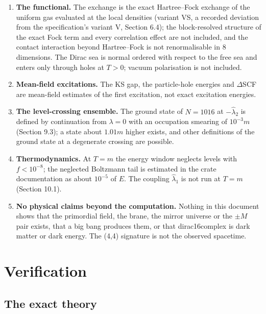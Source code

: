\documentclass[11pt]{article}
\begin{document}
\begin{enumerate}
\item \textbf{The functional.} The exchange is the exact Hartree--Fock exchange of the uniform gas evaluated at the local densities (variant VS, a recorded deviation from the specification's variant V, Section 6.4); the block-resolved structure of the exact Fock term and every correlation effect are not included, and the contact interaction beyond Hartree--Fock is not renormalisable in 8 dimensions. The Dirac sea is normal ordered with respect to the free sea and enters only through holes at $T>0$; vacuum polarisation is not included.
\item \textbf{Mean-field excitations.} The KS gap, the particle-hole energies and $\Delta$SCF are mean-field estimates of the first excitation, not exact excitation energies.
\item \textbf{The level-crossing ensemble.} The ground state of $N=1016$ at $-\hat\lambda_2$ is defined by continuation from $\lambda=0$ with an occupation smearing of $10^{-3}m$ (Section 9.3); a state about $1.01m$ higher exists, and other definitions of the ground state at a degenerate crossing are possible.
\item \textbf{Thermodynamics.} At $T=m$ the energy window neglects levels with $f<10^{-8}$; the neglected Boltzmann tail is estimated in the crate documentation as about $10^{-5}$ of $E$. The coupling $\hat\lambda_1$ is not run at $T=m$ (Section 10.1).
\item \textbf{No physical claims beyond the computation.} Nothing in this document shows that the primordial field, the brane, the mirror universe or the $\pm M$ pair exists, that a big bang produces them, or that dirac16complex is dark matter or dark energy. The (4,4) signature is not the observed spacetime.
\end{enumerate}

\section{Verification}

\subsection{The exact theory}
\end{document}
